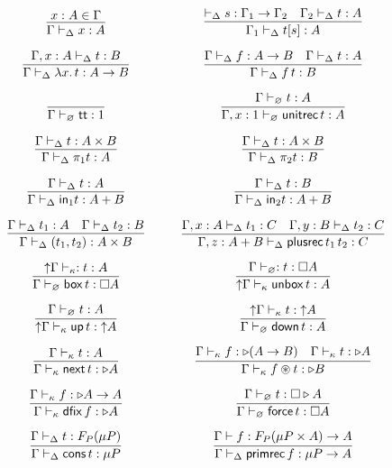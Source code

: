 \[\arraycolsep=15pt\def\arraystretch{2.8}
\begin{array}{cc}
\infer{\Gamma \vdash_{\Delta} x : A}{x : A \in \Gamma}
&
\infer{\Gamma_1 \vdash_{\Delta} t[s] : A}{\vdash_{\Delta} s :  \Gamma_1 \to \Gamma_2 & \Gamma_2 \vdash_{\Delta} t : A}
\\
\infer{\Gamma \vdash_{\Delta} \lambda x.\, t : A \to B}{\Gamma , x : A \vdash_{\Delta} t : B} 
&
\infer{\Gamma \vdash_{\Delta} f\,t : B}{\Gamma \vdash_{\Delta} f : A \to B & \Gamma \vdash_{\Delta} t : A}
\\
\infer{\Gamma \vdash_{\varnothing} {\mathsf{tt}} : 1}{}
&
\infer{\Gamma , x : 1 \vdash_{\varnothing} \mathsf{unitrec}\,t : A}{
\Gamma \vdash_{\varnothing} t : A}
\\
\infer{\Gamma \vdash_{\Delta} \pi_1 t : A}{\Gamma \vdash_{\Delta} t : A \times B}
&
\infer{\Gamma \vdash_{\Delta} \pi_2 t : B}{\Gamma \vdash_{\Delta} t : A \times B}
\\
\infer{\Gamma \vdash_{\Delta} \mathsf{in}_1 t : A + B}{\Gamma \vdash_{\Delta} t : A}
&
\infer{\Gamma \vdash_{\Delta} \mathsf{in}_2 t : A + B}{\Gamma \vdash_{\Delta} t : B}
\\
\infer{\Gamma \vdash_{\Delta} (t_1,t_2) : A \times B}{\Gamma
  \vdash_{\Delta} t_1 : A & \Gamma \vdash_{\Delta} t_2 : B} 
&
\infer{\Gamma,z : A + B \vdash_{\Delta} \mathsf{plusrec} \, t_1\,t_2 : C}{\Gamma,x : A
  \vdash_{\Delta} t_1 : C & \Gamma , y : B \vdash_{\Delta} t_2 : C} 
\\
\infer{\Gamma \vdash_{\varnothing} \boxtm\,t : \square A}{\up \Gamma \vdash_{\kappa} : t : A}
&
\infer{\up \Gamma \vdash_{\kappa} \unboxtm\,t : A}{\Gamma \vdash_{\varnothing} : t : \square A}
\\
\infer{\up \Gamma \vdash_{\kappa} \mathsf{up} \,t : \up A}{\Gamma \vdash_{\varnothing} t : A}
&
\infer {\Gamma \vdash_{\varnothing} \mathsf{down}\,t : A}{\up\Gamma
  \vdash_{\kappa} t : \up A}
\\
\infer{\Gamma \vdash_{\kappa} \next\,t : \later A}{\Gamma \vdash_{\kappa} t : A} 
&
\infer{\Gamma \vdash_{\kappa} f \circledast t : \later B}{\Gamma \vdash_{\kappa} f : \later (A \to B) & \Gamma \vdash_{\kappa} t : \later A}
\\
\infer{\Gamma \vdash_{\kappa} \fix \,f : \later A}{\Gamma \vdash_{\kappa} f : \later A \to A}
&
\infer{\Gamma \vdash_{\varnothing} \force\,t : \square A}{\Gamma \vdash_{\varnothing} t : \square \later A}
\\
\infer{\Gamma \vdash_{\Delta} \cons \, t : \mu P}{
\Gamma \vdash_{\Delta} t : F_P(\mu P)}
&
\infer{\Gamma \vdash_{\Delta} \primrec \, f : \mu P \to A}{%
\Gamma \vdash f : F_P(\mu P \times A) \to A}
\end{array}
\]


